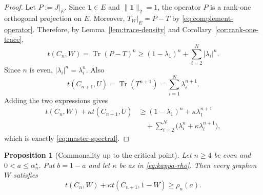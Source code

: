 \documentclass[11pt]{article}
\newtheorem{proposition}[theorem]{Proposition}
\theoremstyle{definition}
\theoremstyle{remark}
\newcommand{\one}{\mathbf{1}}
\newcommand{\tr}{\operatorname{Tr}}
\begin{document}
\begin{proof}
  Let $P:=J|_E$.  Since $\one\in E$ and $\|\one\|_2=1$, the operator $P$ is a
  rank-one orthogonal projection on $E$.  Moreover,
  $T_W|_E=P-T$ by \eqref{eq:complement-operator}.  Therefore, by
  Lemma~\ref{lem:trace-density} and Corollary~\ref{cor:rank-one-trace},
  \[
    t(C_n,W)
    =\tr(P-T)^n
    \ge
    (1-\lambda_1)^n+
    \sum_{i=2}^N|\lambda_i|^n.
  \]
  Since $n$ is even, $|\lambda_i|^n=\lambda_i^n$.  Also
  \[
    t(C_{n+1},U)=\tr(T^{n+1})=\sum_{i=1}^N\lambda_i^{n+1}.
  \]
  Adding the two expressions gives
  \begin{align*}
    t(C_n,W)+\kappa t(C_{n+1},U)
    &\ge
    (1-\lambda_1)^n+\kappa\lambda_1^{n+1}\\
    &\quad+
    \sum_{i=2}^N
    \bigl(\lambda_i^n+\kappa\lambda_i^{n+1}\bigr),
  \end{align*}
  which is exactly \eqref{eq:master-spectral}.
\end{proof}

\begin{proposition}[Commonality up to the critical point]
  \label{prop:lower-bound}
  Let $n\ge4$ be even and $0<a\le\alpha_n^\star$.  Put $b=1-a$ and let
  $\kappa$ be as in \eqref{eq:kappa-rho}.  Then every graphon $W$ satisfies
  \begin{equation}
    t(C_n,W)+\kappa t(C_{n+1},1-W)
    \ge\rho_n(a).
    \label{eq:lower-bound-final}
  \end{equation}
\end{proposition}
\end{document}
